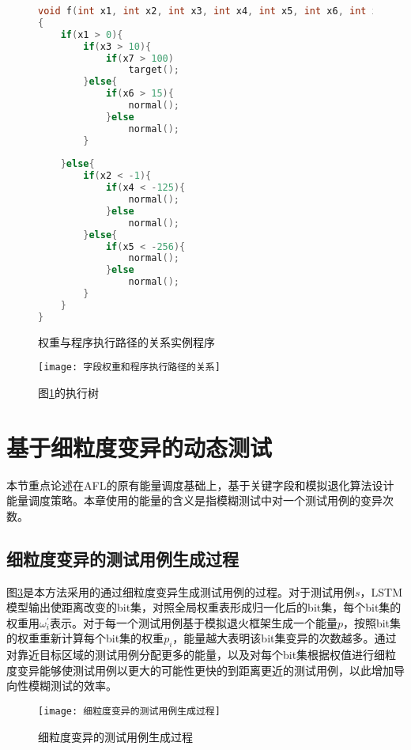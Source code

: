 \begin{figure}[h]
\begin{lstlisting}[language=C]
void f(int x1, int x2, int x3, int x4, int x5, int x6, int x7)
{
	if(x1 > 0){
		if(x3 > 10){
			if(x7 > 100)
				target();
		}else{
			if(x6 > 15){
				normal();
			}else
				normal();
		}
			
	}else{
		if(x2 < -1){
			if(x4 < -125){
				normal();
			}else
				normal();
		}else{
			if(x5 < -256){
				normal();
			}else
				normal();
		}
	}
}
\end{lstlisting}
\caption{权重与程序执行路径的关系实例程序}
\label{权重与程序执行路径的关系实例程序}
\end{figure}



\begin{figure}[htb]
\begin{center}
\texttt{[image: 字段权重和程序执行路径的关系]}
\end{center}
\caption{图\ref{权重与程序执行路径的关系实例程序}的执行树}
\label{字段权重和程序执行路径的关系}
\end{figure}


\section{基于细粒度变异的动态测试}
\label{基于字段权重的模糊测试能量调度策略}

本节重点论述在AFL的原有能量调度基础上，基于关键字段和模拟退化算法设计能量调度策略。本章使用的能量的含义是指模糊测试中对一个测试用例的变异次数。

\subsection{细粒度变异的测试用例生成过程}

图\ref{细粒度变异的测试用例生成过程}是本方法采用的通过细粒度变异生成测试用例的过程。对于测试用例$s$，LSTM模型输出使距离改变的bit集，对照全局权重表形成归一化后的bit集，每个bit集的权重用$\omega^{'}_{i}$表示。对于每一个测试用例基于模拟退火框架生成一个能量$p$，按照bit集的权重重新计算每个bit集的权重$p_i$，能量越大表明该bit集变异的次数越多。通过对靠近目标区域的测试用例分配更多的能量，以及对每个bit集根据权值进行细粒度变异能够使测试用例以更大的可能性更快的到距离更近的测试用例，以此增加导向性模糊测试的效率。

\begin{figure}[htb]
\begin{center}
\texttt{[image: 细粒度变异的测试用例生成过程]}
\end{center}
\caption{细粒度变异的测试用例生成过程}
\label{细粒度变异的测试用例生成过程}
\end{figure}


